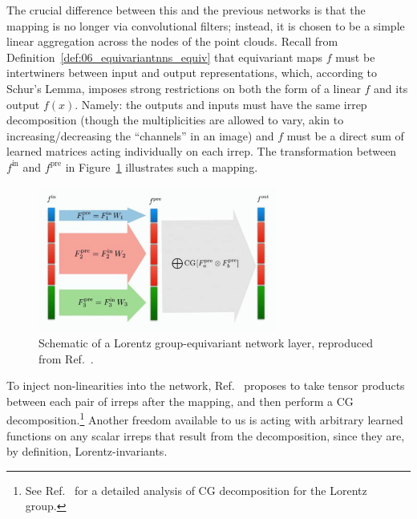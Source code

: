 The crucial difference between this and the previous networks is that the mapping is no longer via convolutional filters; instead, it is chosen to be a simple linear aggregation across the nodes of the point clouds.
Recall from Definition~\ref{def:06_equivariantnns_equiv} that equivariant maps $f$ must be intertwiners between input and output representations, which, according to Schur's Lemma, imposes strong restrictions on both the form of a linear $f$ and its output $f(x)$. Namely: the outputs and inputs must have the same irrep decomposition (though the multiplicities are allowed to vary, akin to increasing/decreasing the ``channels'' in an image) and $f$ must be a direct sum of learned matrices acting individually on each irrep. The transformation between $f^{\mathrm{in}}$ and $f^{\mathrm{pre}}$ in Figure~\ref{fig:06_equivariantnns_equivneuron} illustrates such a mapping. 

\begin{figure}[t]
    \centering
    \includegraphics[width=0.7\textwidth]{figures/06-ML4Jets/equivariantnns/equivneuron}
    \caption{Schematic of a Lorentz group-equivariant network layer, reproduced from Ref.~\cite{bogatskiy2020lorentz}.}
    \label{fig:06_equivariantnns_equivneuron}
\end{figure}

To inject non-linearities into the network, Ref.~\cite{bogatskiy2020lorentz} proposes to take tensor products between each pair of irreps after the mapping, and then perform a CG decomposition.\footnote{See Ref.~\cite{gelfand2018representations} for a detailed analysis of CG decomposition for the Lorentz group.} 
Another freedom available to us is acting with arbitrary learned functions on any scalar irreps that result from the decomposition, since they are, by definition, Lorentz-invariants.  

